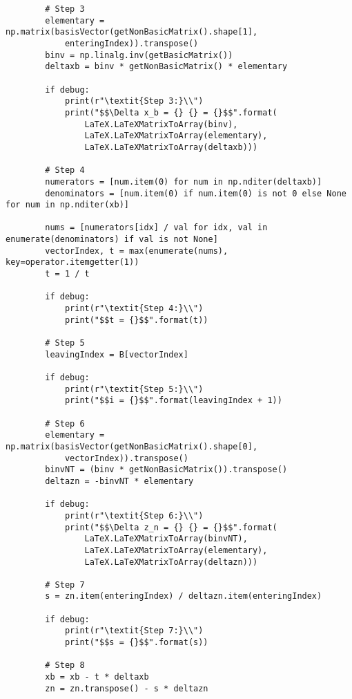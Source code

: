 \documentclass{article}
\begin{document}
\begin{lstlisting}
        # Step 3
        elementary = np.matrix(basisVector(getNonBasicMatrix().shape[1],
            enteringIndex)).transpose()
        binv = np.linalg.inv(getBasicMatrix())
        deltaxb = binv * getNonBasicMatrix() * elementary

        if debug:
            print(r"\textit{Step 3:}\\")
            print("$$\Delta x_b = {} {} = {}$$".format(
                LaTeX.LaTeXMatrixToArray(binv),
                LaTeX.LaTeXMatrixToArray(elementary),
                LaTeX.LaTeXMatrixToArray(deltaxb)))

        # Step 4
        numerators = [num.item(0) for num in np.nditer(deltaxb)]
        denominators = [num.item(0) if num.item(0) is not 0 else None for num in np.nditer(xb)]

        nums = [numerators[idx] / val for idx, val in enumerate(denominators) if val is not None]
        vectorIndex, t = max(enumerate(nums), key=operator.itemgetter(1))
        t = 1 / t

        if debug:
            print(r"\textit{Step 4:}\\")
            print("$$t = {}$$".format(t))

        # Step 5
        leavingIndex = B[vectorIndex]

        if debug:
            print(r"\textit{Step 5:}\\")
            print("$$i = {}$$".format(leavingIndex + 1))

        # Step 6
        elementary = np.matrix(basisVector(getNonBasicMatrix().shape[0],
            vectorIndex)).transpose()
        binvNT = (binv * getNonBasicMatrix()).transpose()
        deltazn = -binvNT * elementary

        if debug:
            print(r"\textit{Step 6:}\\")
            print("$$\Delta z_n = {} {} = {}$$".format(
                LaTeX.LaTeXMatrixToArray(binvNT),
                LaTeX.LaTeXMatrixToArray(elementary),
                LaTeX.LaTeXMatrixToArray(deltazn)))

        # Step 7
        s = zn.item(enteringIndex) / deltazn.item(enteringIndex)

        if debug:
            print(r"\textit{Step 7:}\\")
            print("$$s = {}$$".format(s))

        # Step 8
        xb = xb - t * deltaxb
        zn = zn.transpose() - s * deltazn


\end{lstlisting}
\end{document}
